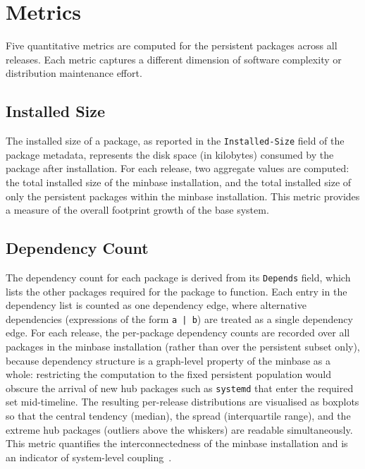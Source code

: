 \section{Metrics}
\label{sec:metrics}

Five quantitative metrics are computed for the persistent packages across all releases. Each metric captures a different dimension of software complexity or distribution maintenance effort.

\subsection{Installed Size}
\label{sec:metric-size}

The installed size of a package, as reported in the \texttt{Installed-Size} field of the package metadata, represents the disk space (in kilobytes) consumed by the package after installation. For each release, two aggregate values are computed: the total installed size of the minbase installation, and the total installed size of only the persistent packages within the minbase installation. This metric provides a measure of the overall footprint growth of the base system.

\subsection{Dependency Count}
\label{sec:metric-deps}

The dependency count for each package is derived from its \texttt{Depends} field, which lists the other packages required for the package to function. Each entry in the dependency list is counted as one dependency edge, where alternative dependencies (expressions of the form \texttt{a | b}) are treated as a single dependency edge. For each release, the per-package dependency counts are recorded over all packages in the minbase installation (rather than over the persistent subset only), because dependency structure is a graph-level property of the minbase as a whole: restricting the computation to the fixed persistent population would obscure the arrival of new hub packages such as \texttt{systemd} that enter the required set mid-timeline. The resulting per-release distributions are visualised as boxplots so that the central tendency (median), the spread (interquartile range), and the extreme hub packages (outliers above the whiskers) are readable simultaneously. This metric quantifies the interconnectedness of the minbase installation and is an indicator of system-level coupling~\cite{interPackageDependency}.

